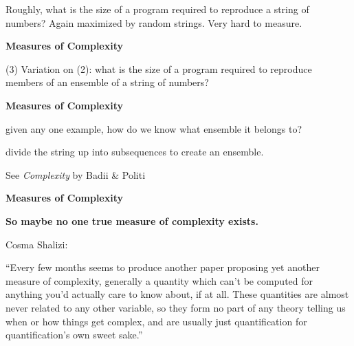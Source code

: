      Roughly, what is the size of a program required to reproduce a 
      string of numbers?
     Again maximized by random strings.
     Very hard to measure.
    
    
  


  \textbf{Measures of Complexity}

  (3) Variation on (2): what is the size of a program
  required to reproduce members of an ensemble of
  a string of numbers?

  \bigskip

  {
  }


  \textbf{Measures of Complexity}

   given any one example, how do we know
  what ensemble it belongs to?

  \bigskip

  { 
     divide the string up into subsequences
    to create an ensemble.

    \bigskip

    {
      See \textit{Complexity} by Badii \& Politi\cite{badii1997a}
    }
  }


  \textbf{Measures of Complexity}

  \textbf{So maybe no one true measure of complexity exists.}

    \medskip

    {
      \alert{Cosma Shalizi:}

      \medskip

      ``Every few months seems to produce another paper proposing yet
      another measure of complexity, generally a quantity which can't be
      computed for anything you'd actually care to know about, if at
      all. These quantities are almost never related to any other variable,
      so they form no part of any theory telling us when or how things get
      complex, and are usually just quantification for quantification's own
      sweet sake.''
    }
  

